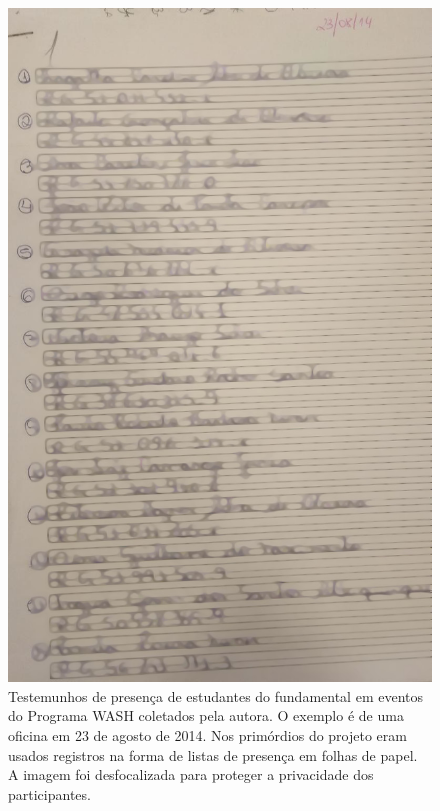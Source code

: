 \documentclass[
12pt,		%
openright,	%
twoside,  %
a4paper,			%
chapter=TITLE,		%
english,			%
french,				%
spanish,			%
brazil				%
]{USPSC-classe/USPSC}
\begin{document}
\captionsetup{format=plain}
\begin{figure}[max size={\textwidth}{\textheight}]

\centering


\begin{minipage}[b]{0.4\linewidth}
        \centering
                \includegraphics[width=1.0\linewidth]{../../imagens/blurred-Presenca-Oficina-2014-08-23.jpeg}
                \caption{Testemunhos de presen\c{c}a de estudantes do fundamental em eventos do Programa WASH coletados pela autora. O exemplo \'e de uma oficina em 23 de agosto de 2014. Nos prim\'ordios do projeto eram usados registros na forma de listas de presen\c{c}a em folhas de papel. A imagem foi desfocalizada para proteger a privacidade dos participantes.}

\end{minipage}
\end{figure}
\end{document}

